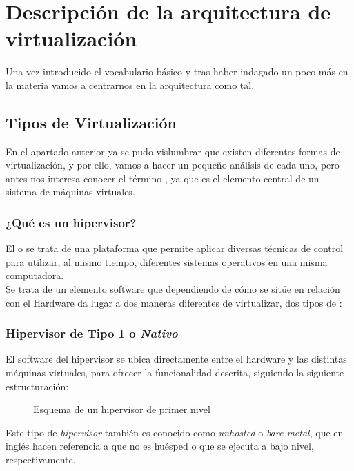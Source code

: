 \chapter[Descripción de la arquitectura]{Descripción de la arquitectura de virtualización}

\lettrine[lines=1,slope=4pt,findent=0pt]{U}{}na vez introducido el vocabulario básico y tras haber indagado un poco más en la materia vamos a centrarnos en la arquitectura como tal.\\

\section{Tipos de Virtualización}
En el apartado anterior ya se pudo vislumbrar que existen diferentes formas de virtualización, y por ello, vamos a hacer un pequeño análisis de cada uno, pero antes nos interesa conocer el término \emph{}, ya que es el elemento central de un sistema de máquinas virtuales.

\subsection{¿Qué es un hipervisor?}
El \emph{} o \emph{} se trata de una plataforma que permite aplicar diversas técnicas de control para utilizar, al mismo tiempo, diferentes sistemas operativos en una misma computadora.\\

Se trata de un elemento software que dependiendo de cómo se sitúe en relación con el Hardware da lugar a dos maneras diferentes de virtualizar, dos tipos de \emph{}\cite{tipoship}:

\subsection{Hipervisor de Tipo 1 o \emph{Nativo}}
 El software del hipervisor se ubica directamente entre el hardware y las distintas máquinas virtuales, para ofrecer la funcionalidad descrita, siguiendo la siguiente estructuración:

\begin{figure}[H]
\begin{center}
\end{center}
\caption[Hipervisor Tipo 1]{Esquema de un hipervisor de primer nivel}
\end{figure}

Este tipo de \emph{hipervisor} también es conocido como \emph{unhosted} o \emph{bare metal}, que en inglés hacen referencia a que no es huésped o que se ejecuta a bajo nivel, respectivamente.\\

